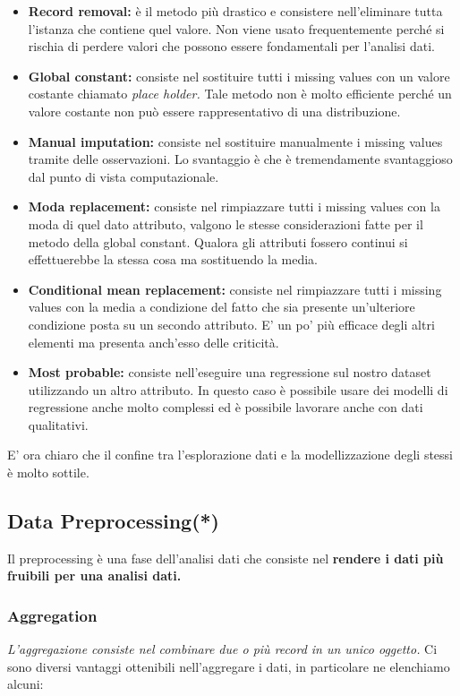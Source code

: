 \begin{itemize}
	\item \textbf{Record removal:} è il metodo più drastico e consistere nell'eliminare tutta l'istanza che contiene quel valore. Non viene usato frequentemente perché si rischia di perdere valori che possono essere fondamentali per l'analisi dati.
	
	\item \textbf{Global constant:} consiste nel sostituire tutti i missing values con un valore costante chiamato \textit{place holder.} Tale metodo non è molto efficiente perché un valore costante non può essere rappresentativo di una distribuzione.
	
	\item \textbf{Manual imputation:} consiste nel sostituire manualmente i missing values tramite delle osservazioni. Lo svantaggio è che è tremendamente svantaggioso dal punto di vista computazionale.
	\item  \textbf{Moda replacement:} consiste nel rimpiazzare tutti i missing values con la moda di quel dato attributo, valgono le stesse considerazioni fatte per il metodo della global constant. Qualora gli attributi fossero continui si effettuerebbe la stessa cosa ma sostituendo la media.
	\item \textbf{Conditional mean replacement:} consiste nel rimpiazzare tutti i missing values con la media a condizione del fatto che sia presente un'ulteriore condizione posta su un secondo attributo. E' un po' più efficace degli altri elementi ma presenta anch'esso delle criticità.
	
	\item \textbf{Most probable:} consiste nell'eseguire una regressione sul nostro dataset utilizzando un altro attributo. In questo caso è possibile usare dei modelli di regressione anche molto complessi ed è possibile lavorare anche con dati qualitativi.
\end{itemize}

E' ora chiaro che il confine tra l'esplorazione dati e la modellizzazione degli stessi è molto sottile.

\subsection{Data Preprocessing(*)}

Il preprocessing è una fase dell'analisi dati che consiste nel \textbf{rendere i dati più fruibili per una analisi dati.}

\subsubsection{Aggregation}
\textit{L'aggregazione consiste nel combinare due o più record in un unico oggetto.}
Ci sono diversi vantaggi ottenibili nell'aggregare i dati, in particolare ne elenchiamo alcuni:

